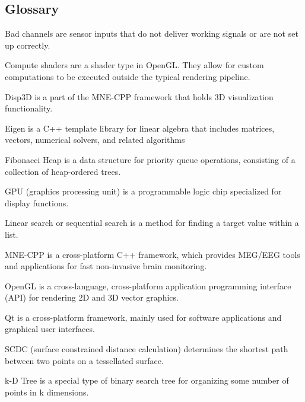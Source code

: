 \subsection {Glossary}
\begin{aims}

\item [Bad channels] are sensor inputs that do not deliver working signals or are not set up correctly.
\item [Compute shaders] are a shader type in OpenGL. They allow for custom computations to be executed outside the typical rendering pipeline.
\item [Disp3D] is a part of the MNE-CPP framework that holds 3D visualization functionality.
\item[Eigen] is a C++ template library for linear algebra that includes matrices, vectors, numerical solvers, and related algorithms
\item [Fibonacci Heap] is a data structure for priority queue operations, consisting of a collection of heap-ordered trees.
\item [GPU] (graphics processing unit) is a programmable logic chip specialized for display functions.
\item [Linear search] or sequential search is a method for finding a target value within a list.
\item [MNE-CPP] is a cross-platform C++ framework, which provides MEG/EEG tools and applications for fast non-invasive brain monitoring.
\item [OpenGL] is a cross-language, cross-platform application programming interface (API) for rendering 2D and 3D vector graphics.
\item [Qt] is a cross-platform framework, mainly used for software applications and graphical user interfaces.
\item [SCDC] (surface constrained distance calculation) determines the shortest path between two points on a tessellated surface.
\item[k-D Tree] is a special type of binary search tree for organizing some number of points in k dimensions.
\end{aims} 
